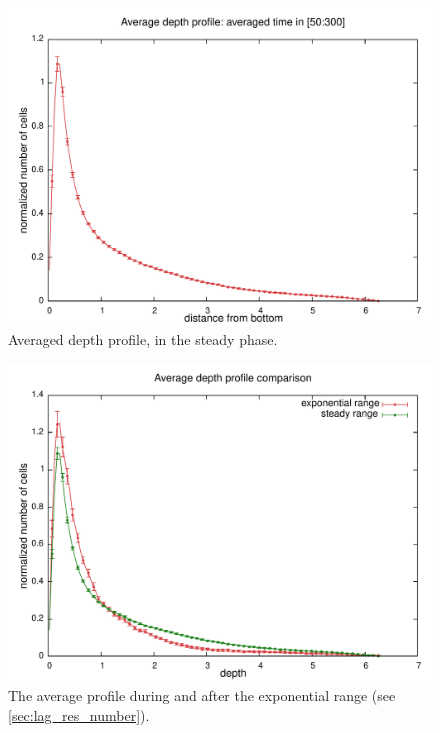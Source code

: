 \begin{figure}[ht]
    \includegraphics[width=\textwidth]{data/3D_model/run2/profile_avg_1_50_300}
    \caption{Averaged depth profile, in the steady phase.}
    \label{fig:lag_res_rho_err} \label{fig:lag_res_prof_err}
\end{figure}

\begin{figure}[h]
        \includegraphics[width=\textwidth]{data/3D_model/run2/rho_comparison}
        \caption{The average profile during and after the exponential range (see \autoref{sec:lag_res_number}).}
        \label{fig:lag_res_rho_comparison}
\end{figure}


